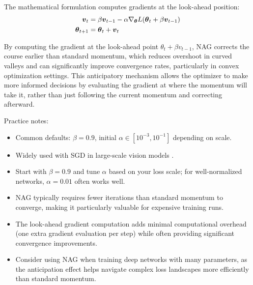 The mathematical formulation computes gradients at the look-ahead position:
\begin{align}
\boldsymbol{v}_t &= \beta \boldsymbol{v}_{t-1} - \alpha \nabla_{\boldsymbol{\theta}} L(\boldsymbol{\theta}_t + \beta \boldsymbol{v}_{t-1}) \\
\boldsymbol{\theta}_{t+1} &= \boldsymbol{\theta}_t + \boldsymbol{v}_t
\end{align}

By computing the gradient at the look-ahead point \(\theta_t+\beta v_{t-1}\), NAG corrects the course earlier than standard momentum, which reduces overshoot in curved valleys and can significantly improve convergence rates, particularly in convex optimization settings. This anticipatory mechanism allows the optimizer to make more informed decisions by evaluating the gradient at where the momentum will take it, rather than just following the current momentum and correcting afterward.\cite{Nesterov1983,WebOptimizationDLBook,GoodfellowEtAl2016}

Practice notes:
\begin{itemize}
    \item Common defaults: \(\beta=0.9\), initial \(\alpha\in[10^{-3},10^{-1}]\) depending on scale.
    \item Widely used with SGD in large-scale vision models \cite{He2016}.
    \item Start with \(\beta=0.9\) and tune \(\alpha\) based on your loss scale; for well-normalized networks, \(\alpha=0.01\) often works well.
    \item NAG typically requires fewer iterations than standard momentum to converge, making it particularly valuable for expensive training runs.
    \item The look-ahead gradient computation adds minimal computational overhead (one extra gradient evaluation per step) while often providing significant convergence improvements.
    \item Consider using NAG when training deep networks with many parameters, as the anticipation effect helps navigate complex loss landscapes more efficiently than standard momentum.
\end{itemize}

